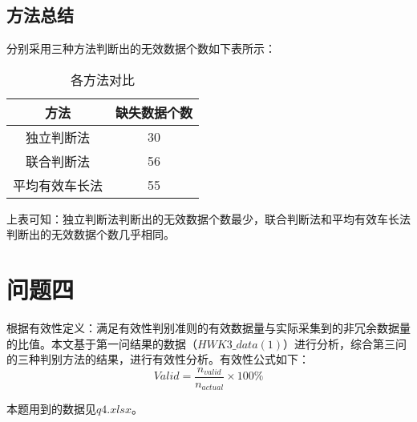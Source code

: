 \documentclass[withoutpreface,bwprint]{cumcmthesis} %
\begin{document}
        \subsection{方法总结}
        分别采用三种方法判断出的无效数据个数如下表所示：\newpage
        \begin{table}[!htbp]
            \centering
            \caption{各方法对比}
            \begin{tabular}{cc} 
                \toprule[1.5pt]
                方法 & 缺失数据个数 \\ 
                \midrule 
                独立判断法 & 30 \\
                联合判断法 & 56 \\
                平均有效车长法 & 55 \\
                \bottomrule[1.5pt]
            \end{tabular}
        \end{table}
        上表可知：独立判断法判断出的无效数据个数最少，联合判断法和平均有效车长法判断出的无效数据个数几乎相同。
\section{问题四}
根据有效性定义：满足有效性判别准则的有效数据量与实际采集到的非冗余数据量的比值。本文基于第一问结果的数据（$HWK3\_data(1)$）进行分析，综合第三问的三种判别方法的结果，进行有效性分析。有效性公式如下：
\begin{equation}
    Valid=\frac{n_{valid}}{n_{actual}}\times 100\%
\end{equation}\par
本题用到的数据见$q4.xlsx$。\par
\end{document}
